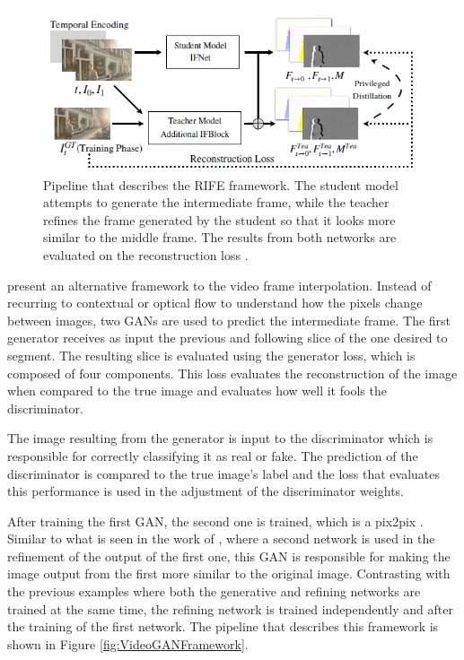 \begin{figure}[!ht]
	\centering
	\includegraphics[width=0.85\linewidth]{figures/RIFEPipeline.png}
	\caption{Pipeline that describes the RIFE framework. The student model attempts to generate the intermediate frame, while the teacher refines the frame generated by the student so that it looks more similar to the middle frame. The results from both networks are evaluated on the reconstruction loss \parencite{Huang2022}.}
	\label{fig:RIFEPipeline}
\end{figure}

\textcite{Tran2020} present an alternative framework to the video frame interpolation. Instead of recurring to contextual or optical flow to understand how the pixels change between images, two GANs are used to predict the intermediate frame. The first generator receives as input the previous and following slice of the one desired to segment. The resulting slice is evaluated using the generator loss, which is composed of four components. This loss evaluates the reconstruction of the image when compared to the true image and evaluates how well it fools the discriminator.
\par
The image resulting from the generator is input to the discriminator which is responsible for correctly classifying it as real or fake. The prediction of the discriminator is compared to the true image's label and the loss that evaluates this performance is used in the adjustment of the discriminator weights.
\par
After training the first GAN, the second one is trained, which is a pix2pix \parencite{Isola2017}. Similar to what is seen in the work of \textcite{Gambini2024, Huang2022}, where a second network is used in the refinement of the output of the first one, this GAN is responsible for making the image output from the first more similar to the original image. Contrasting with the previous examples where both the generative and refining networks are trained at the same time, the refining network is trained independently and after the training of the first network. The pipeline that describes this framework is shown in Figure \ref{fig:VideoGANFramework}.

